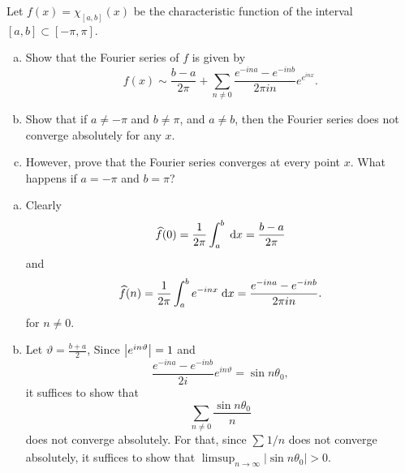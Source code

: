 \begin{exrc}[9]
    Let \(f(x) = \chi_{[a, b]}(x)\) be the characteristic function of the interval
    \([a, b] \subset [-\pi, \pi]\).
    \begin{enumerate}[(a)]
    \item
        Show that the Fourier series of \(f\) is given by
        \begin{equation*}
            f(x) \sim \frac{b - a}{2\pi} + \sum_{n \neq 0}^{} \frac{e^{-ina} - e^{-inb}}{2 \pi i n}e^{e^{inx}}.
        \end{equation*}

    \item
        Show that if \(a \neq -\pi\) and \(b \neq \pi\), and \(a \neq b\),
        then the Fourier series does not converge absolutely for any \(x\).

    \item
        However, prove that the Fourier series converges at every point \(x\).
        What happens if \(a = -\pi\) and \(b = \pi\)?
    \end{enumerate}

\begin{soln}
    \begin{enumerate}[(a)]
    \item
        Clearly
        \begin{equation*}
            \widehat{f}(0) = \frac{1}{2\pi} \int_{a}^{b}  \;\mathrm d x = \frac{b - a}{2\pi}
        \end{equation*}
        and
        \begin{equation*}
            \widehat{f}(n) = \frac{1}{2\pi} \int_{a}^{b} e^{-inx} \;\mathrm d x
            = \frac{e^{-ina} - e^{-inb}}{2 \pi i n}.
        \end{equation*}
        for \(n \neq 0\).

    \item
        Let \(\vartheta = \frac{b + a}{2}\),
        Since \(\abs{e^{in \vartheta}} = 1\) and
        \begin{equation*}
            \frac{e^{-ina} - e^{-inb}}{2i} e^{in \vartheta} = \sin n \theta_0,
        \end{equation*}
        it suffices to show that
        \begin{equation*}
            \sum_{n \neq 0}^{} \frac{\sin n\theta_0}{n}
        \end{equation*}
        does not converge absolutely.
        For that, since \(\sum_{}^{} 1 / n\) does not converge absolutely,
        it suffices to show that \(\limsup_{n \to \infty} |\sin n\theta_0| > 0\).


\end{enumerate}
\end{soln}
\end{exrc}
